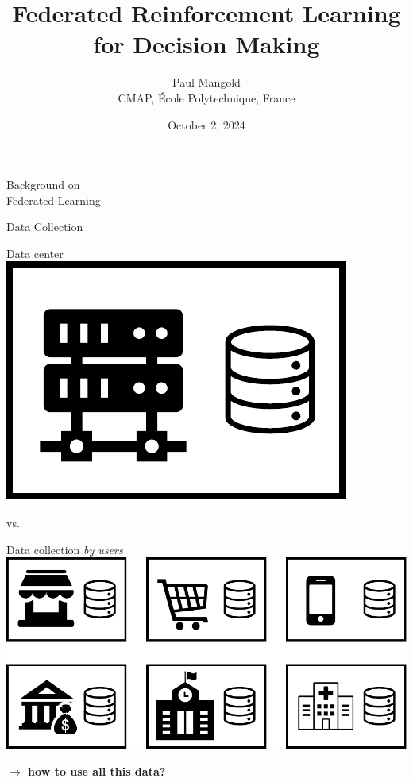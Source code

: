 \documentclass[aspectratio=169,12pt]{beamer}
\title{Federated Reinforcement Learning for Decision Making}
\author{
  \vspace{-0.5em}
  Paul Mangold\\[1em]
  CMAP, École Polytechnique, France
  \vspace{-1em}
}
\institute{}
\date{October 2, 2024}
\begin{document}

\begin{frame}[plain]
  \titlepage
\end{frame}
\addtocounter{framenumber}{-1}

\begin{frame}
  \begin{center}
    \textcolor{beamer@blendedblue}{
      \huge Background on \\[1em]
      \huge Federated Learning
    }
  \end{center}
\end{frame}

\begin{frame}{Data Collection}
  \hspace{-3em}
  \begin{minipage}{0.5\linewidth}
    \begin{center}
      Data center\\[0.5em]
      
      \includegraphics[width=0.4\linewidth]{images/central.pdf}
    \end{center}
    
  \end{minipage}\pause vs.\hspace{1.5em}%
  \begin{minipage}{0.5\linewidth}
    \pause
    \begin{center}
      Data collection \emph{by users} \\[0.5em]
      
      \includegraphics[width=0.8\linewidth]{images/decentralized.pdf}
    \end{center}
  \end{minipage}

  \vspace{1em}

  \pause
  
  \begin{center}
    \textbf{
    $\rightarrow$ how to use all this data?}
  \end{center}
\end{frame}
\end{document}
